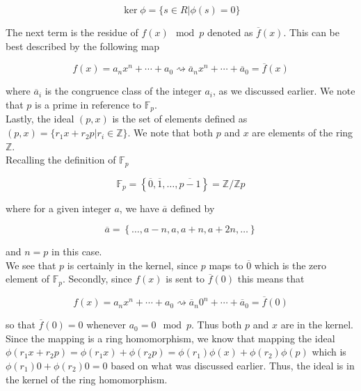 \begin{displaymath}
\ker \phi = \{s \in R | \phi(s)=0 \}
\end{displaymath}

The next term is the residue of $f(x) \mod p$ denoted as $\overline{f}(x)$.  This can be best described by the following map

\begin{displaymath}
f(x) = a_{n}x^{n}+\cdots+a_{0} \rightsquigarrow \overline{a}_{n}x^{n}+\cdots+\overline{a}_{0} = \overline{f}(x) 
\end{displaymath}

where $\overline{a}_{i}$ is the congruence class of the integer $a_{i}$, as we discussed earlier.  We note that $p$ is a prime in reference to $\mathbb{F}_{p}$.\\

Lastly, the ideal $(p,x)$ is the set of elements defined as $(p,x) =\{r_{1}x+r_{2}p | r_{i} \in \mathbb{Z} \}$.  We note that both $p$ and $x$ are elements of the ring $\mathbb{Z}$.\\

Recalling the definition of $\mathbb{F}_{p}$

\begin{displaymath}
\mathbb{F}_{p}=\left\{\overline{0}, \overline{1}, \ldots, \overline{p-1} \right\}=\mathbb{Z}/\mathbb{Z}p
\end{displaymath}

where for a given integer $a$, we have $\overline{a}$ defined by

\begin{displaymath}
\overline{a}=\left\{\ldots, a-n, a, a+n, a+2n, \ldots \right\}
\end{displaymath}

and $n=p$ in this case.\\

We see that $p$ is certainly in the kernel, since $p$ maps to $\overline{0}$ which is the zero element of $\mathbb{F}_{p}$.  Secondly, since $f(x)$ is sent to $\overline{f}(0)$ this means that 

\begin{displaymath}
f(x) = a_{n}x^{n}+\cdots+a_{0} \rightsquigarrow \overline{a}_{n}0^{n}+\cdots+\overline{a}_{0} = \overline{f}(0) 
\end{displaymath}

so that $\overline{f}(0)=0$ whenever $a_{0}=0 \mod p$.  Thus both $p$ and $x$ are in the kernel.  Since the mapping is a ring homomorphism, we know that mapping the ideal $\phi(r_{1}x+r_{2}p)=\phi(r_{1}x)+\phi(r_{2}p)=\phi(r_{1})\phi(x)+\phi(r_{2})\phi(p)$ which is $\phi(r_{1})0+\phi(r_{2})0 = 0$ based on what was discussed earlier.  Thus, the ideal is in the kernel of the ring homomorphism.\\

